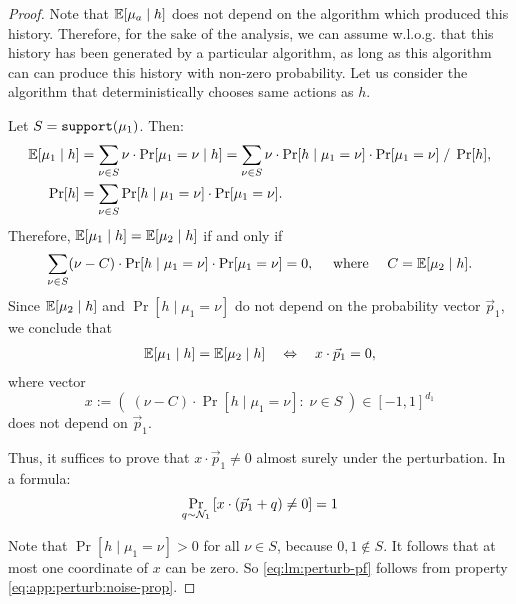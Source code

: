 \begin{proof}
Note that $\E[\mu_a\mid h]$ does not depend on the algorithm which produced this history. Therefore, for the sake of the analysis, we can assume w.l.o.g. that this history has been generated by a particular algorithm, as long as this algorithm can can produce this history with non-zero probability. Let us consider  the algorithm that deterministically chooses same actions as $h$.

Let $S = \mathtt{support}(\mu_1)$. Then:
\begin{align*}
\E[\mu_1\mid h]
    &= \sum_{\nu\in S} \nu \cdot \Pr[\mu_1 =\nu \mid h]
    = \sum_{\nu\in S} \nu \cdot \Pr[h \mid \mu_1 =\nu] \cdot \Pr[\mu_1=\nu]\;/\;\Pr[h], \\
\Pr[h]
    &= \sum_{\nu\in S} \Pr[h \mid \mu_1 =\nu] \cdot \Pr[\mu_1=\nu].
\end{align*}
Therefore,
    $\E[\mu_1\mid h] = \E[\mu_2\mid h] $
if and only if
\begin{align*}
\sum_{\nu\in S} (\nu-C) \cdot \Pr[h \mid \mu_1 =\nu] \cdot \Pr[\mu_1=\nu] = 0,
\quad\text{ where }\quad C=\E[\mu_2\mid h].
\end{align*}
Since $\E[\mu_2\mid h]$ and $\Pr[h \mid \mu_1 =\nu]$ do not depend on the probability vector $\vec{p}_1$, we conclude that
\begin{align*}
  \E[\mu_1\mid h] = \E[\mu_2\mid h]
\quad\Leftrightarrow\quad x\cdot \vec{p}_1 =0,
\end{align*}
where vector
    \[ x := \left(\; (\nu-C) \cdot \Pr[h \mid \mu_1 =\nu]:\; \nu\in S\; \right) \in [-1,1]^{d_1}\]
does not depend on $\vec{p}_1$.

Thus, it suffices to prove that $x\cdot \vec{p}_1 \neq 0$ almost surely under the perturbation. In a formula:
\begin{align}\label{eq:lm:perturb-pf}
    \Pr_{q\sim \mathcal{N}_1}\left[ x\cdot( \vec{p}_1+q) \neq 0 \right] =1
\end{align}

Note that $\Pr[h \mid \mu_1 =\nu]>0$ for all $\nu\in S$, because $0,1\not\in S$. It follows that at most one coordinate of $x$ can be zero. So  \eqref{eq:lm:perturb-pf} follows from property \eqref{eq:app:perturb:noise-prop}.
\end{proof}
